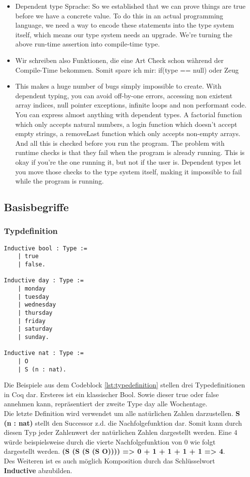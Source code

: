 \begin{itemize}
	\item Dependent type Sprache: So we established that we can prove things are true before we have a concrete value. To do this in an actual programming language, we need a way to encode these statements into the type system itself, which means our type system needs an upgrade.
	We're turning the above run-time assertion into compile-time type.
	\item Wir schreiben also Funktionen, die eine Art Check schon während der Compile-Time bekommen. Somit spare ich mir: if(type == null) oder Zeug
	\item This makes a huge number of bugs simply impossible to create. With dependent typing, you can avoid off-by-one errors, accessing non existent array indices, null pointer exceptions, infinite loops and non performant code.
	You can express almost anything with dependent types. A factorial function which only accepts natural numbers, a login function which doesn't accept empty strings, a removeLast function which only accepts non-empty arrays. And all this is checked before you run the program.
	The problem with runtime checks is that they fail when the program is already running. This is okay if you’re the one running it, but not if the user is. Dependent types let you move those checks to the type system itself, making it impossible to fail while the program is running.
\end{itemize}
\subsection{Basisbegriffe}
\subsubsection{Typdefinition}
\begin{lstlisting}[language=coq,firstnumber=1,caption=Coq Typedefinition,label=lst:typedefinition]
Inductive bool : Type :=
	| true
	| false.
	
Inductive day : Type :=
	| monday
	| tuesday
	| wednesday
	| thursday
	| friday
	| saturday
	| sunday.
	
Inductive nat : Type :=
	| O
	| S (n : nat).
\end{lstlisting}

Die Beispiele aus dem Codeblock \ref{lst:typedefinition} stellen drei Typedefinitionen in Coq dar. Ersteres ist ein klassischer Bool. Sowie dieser true oder false annehmen kann, repräsentiert der zweite Type day alle Wochentage. \\
Die letzte Definition wird verwendet um alle natürlichen Zahlen darzustellen. \textbf{S (n : nat)} stellt den Successor z.d. die Nachfolgefunktion dar. Somit kann durch diesen Typ jeder Zahlenwert der natürlichen Zahlen dargestellt werden. Eine 4 würde beispielsweise durch die vierte Nachfolgefunktion von 0 wie folgt dargestellt werden. \textbf{(S (S (S (S O)))) => 0 + 1 + 1 + 1 + 1 => 4}.\\
Des Weiteren ist es auch möglich Komposition durch das Schlüsselwort \textbf{Inductive} abzubilden.

